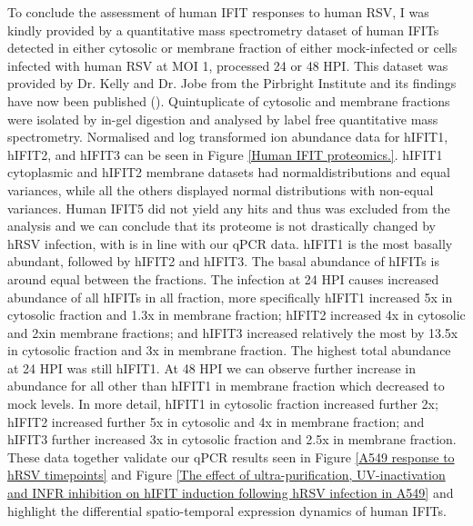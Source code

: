 To conclude the assessment of human IFIT responses to human RSV, I was kindly provided by a quantitative mass spectrometry dataset of human IFITs detected in either cytosolic or membrane fraction of either mock-infected or cells infected with human RSV at MOI 1, processed 24 or 48 HPI. This dataset was provided by Dr. Kelly and Dr. Jobe from the Pirbright Institute and its findings have now been published (\cite{Jobe2023ViralCondensates}). Quintuplicate of cytosolic and membrane fractions were isolated by in-gel digestion and analysed by label free quantitative mass spectrometry. Normalised and log transformed ion abundance data for hIFIT1, hIFIT2, and hIFIT3 can be seen in Figure \ref{Human IFIT proteomics.}. hIFIT1 cytoplasmic and hIFIT2 membrane datasets had normaldistributions and equal variances, while all the others displayed normal distributions with non-equal variances. Human IFIT5 did not yield any hits and thus was excluded from the analysis and we can conclude that its proteome is not drastically changed by hRSV infection, with is in line with our qPCR data. hIFIT1 is the most basally abundant, followed by hIFIT2 and hIFIT3. The basal abundance of hIFITs is around equal between the fractions. The infection at 24 HPI causes increased abundance of all hIFITs in all fraction, more specifically hIFIT1 increased 5x in cytosolic fraction and 1.3x in membrane fraction; hIFIT2 increased 4x in cytosolic and 2xin membrane fractions; and hIFIT3 increased relatively the most by 13.5x in cytosolic fraction and 3x in membrane fraction. The highest total abundance at 24 HPI was still hIFIT1. At 48 HPI we can observe further increase in abundance for all other than hIFIT1 in membrane fraction which decreased to mock levels. In more detail, hIFIT1 in cytosolic fraction increased further 2x; hIFIT2 increased further 5x in cytosolic and 4x in membrane fraction; and hIFIT3 further increased 3x in cytosolic fraction and 2.5x in membrane fraction. These data together validate our qPCR results seen in Figure \ref{A549 response to hRSV timepoints} and Figure \ref{The effect of ultra-purification, UV-inactivation and INFR inhibition on hIFIT induction following hRSV infection in A549} and highlight the differential spatio-temporal expression dynamics of human IFITs.


